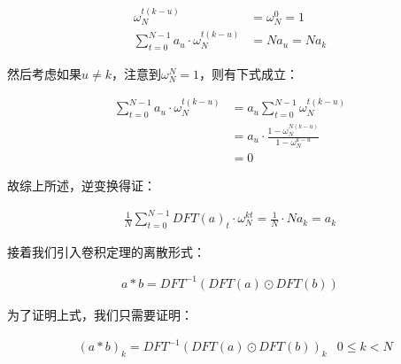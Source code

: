 \documentclass[UTF8]{book}
\begin{document}
\begin{large}
    \begin{equation}
        \begin{aligned}
            \omega_N^{t(k-u)}&=\omega_N^{0}=1 \\
            \sum_{t=0}^{N-1}a_u \cdot \omega_N^{t(k-u)}&=Na_u=Na_k
            \nonumber
        \end{aligned}
    \end{equation}
\end{large}
然后考虑如果$u \not = k$，注意到$\omega_N^N=1$，则有下式成立：
\begin{large}
    \begin{equation}
        \begin{aligned}
            \sum_{t=0}^{N-1}a_u \cdot \omega_N^{t(k-u)} &= a_u\sum_{t=0}^{N-1}\omega_N^{t(k-u)} \\
            &= a_u \cdot \frac{1-\omega_N^{N(k-u)}}{1-\omega_N^{k-u}} \\
            &= 0
            \nonumber
        \end{aligned}
    \end{equation}
\end{large}
故综上所述，逆变换得证：
\begin{large}
    \begin{equation}
        \begin{aligned}
            \frac{1}{N}\sum_{t=0}^{N-1}{DFT(a)_t \cdot \omega_{N}^{kt}}=\frac{1}{N} \cdot Na_k=a_k
            \nonumber
        \end{aligned}
    \end{equation}
\end{large}
接着我们引入卷积定理的离散形式：
\begin{large}
    \begin{equation}
        \begin{aligned}
            a*b=DFT^{-1}\left ( DFT(a) \odot DFT(b) \right )
            \nonumber
        \end{aligned}
    \end{equation}
\end{large}
为了证明上式，我们只需要证明：
\begin{large}
    \begin{equation}
        \begin{aligned}
            &(a*b)_k=DFT^{-1}\left ( DFT(a) \odot DFT(b) \right )_k & 0 \le k < N
            \nonumber
        \end{aligned}
    \end{equation}
\end{large}
\end{document}
